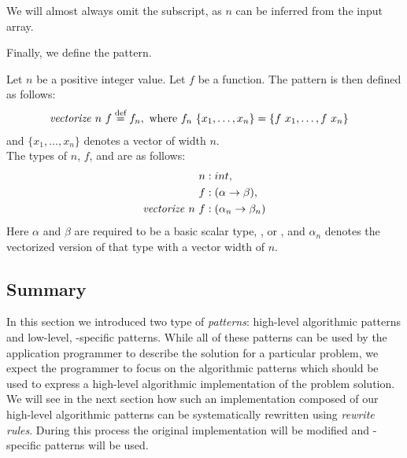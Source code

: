 We will almost always omit the subscript, as $n$ can be inferred from the input array.

\noindent
Finally, we define the \vect pattern.
\begin{definition}
  \label{definition:pattern:vect}
  Let $n$ be a positive integer value.
  Let $f$ be a function.
  The \vect pattern is then defined as follows:
  \begin{align*}
    \text{\textit{vectorize}}\ n\ f &\stackrel{\textrm{\scriptsize def}}{=} f_n, \text{ where } f_n\ \{x_1, \ldots, x_n\} = \{f\ x_1, \ldots, f\ x_n \}
  \end{align*}
  and $\{x_1,\ldots,x_n\}$ denotes a vector of width $n$.\\
  The types of $n$, $f$, and \vect are as follows:
  \begin{align*}
    n &: int,\\
    f &: (\alpha \rightarrow \beta),\\
    \text{\textit{vectorize}}\ n\ f &: (\alpha_n \rightarrow \beta_n)
  \end{align*}
  Here $\alpha$ and $\beta$ are required to be a basic scalar type, \eg,  or , and $\alpha_n$ denotes the vectorized version of that type with a vector width of $n$.
\end{definition}

\subsection{Summary}
In this section we introduced two type of \emph{patterns}:
high-level algorithmic patterns and low-level, \OpenCL-specific patterns.
While all of these patterns can be used by the application programmer to describe the solution for a particular problem, we expect the programmer to focus on the algorithmic patterns which should be used to express a high-level algorithmic implementation of the problem solution.
We will see in the next section how such an implementation composed of our high-level algorithmic patterns can be systematically rewritten using \emph{rewrite rules}.
During this process the original implementation will be modified and \OpenCL-specific patterns will be used.


